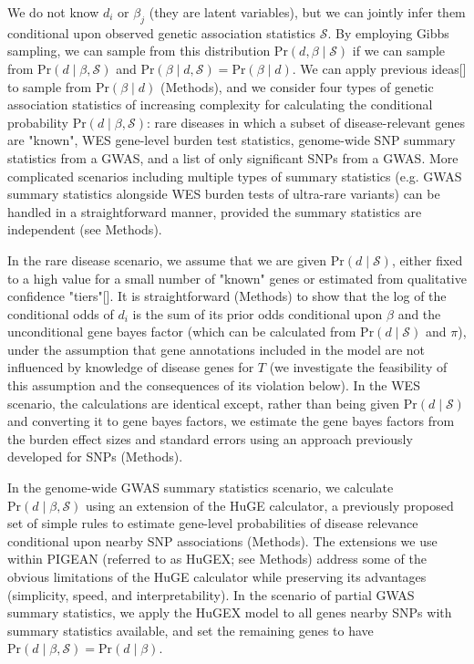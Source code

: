 \documentclass[sn-nature,lineno]{sn-jnl}%
\theoremstyle{thmstyleone}%
\theoremstyle{thmstyletwo}%
\theoremstyle{thmstylethree}%
\newcommand{\prob}{\text{Pr}}
\begin{document}
We do not know $d_i$ or $\beta_j$ (they are latent variables), but we can jointly infer them conditional upon observed genetic association statistics $\mathcal{S}$. By employing Gibbs sampling, we can sample from this distribution $\prob(d, \beta \mid \mathcal{S})$ if we can sample from $\prob(d \mid \beta, \mathcal{S})$ and $\prob(\beta \mid d, \mathcal{S})=\prob(\beta \mid d)$. We can apply previous ideas[] to sample from $\prob(\beta \mid d)$ (Methods), and we consider four types of genetic association statistics of increasing complexity for calculating the conditional probability $\prob(d \mid \beta, \mathcal{S})$: rare diseases in which a subset of disease-relevant genes are "known", WES gene-level burden test statistics, genome-wide SNP summary statistics from a GWAS, and a list of only significant SNPs from a GWAS. More complicated scenarios including multiple types of summary statistics (e.g. GWAS summary statistics alongside WES burden tests of ultra-rare variants) can be handled in a straightforward manner, provided the summary statistics are independent (see Methods).

In the rare disease scenario, we assume that we are given $\prob(d \mid \mathcal{S})$, either fixed to a high value for a small number of "known" genes or estimated from qualitative confidence "tiers"[].  It is straightforward (Methods) to show that the log of the conditional odds of $d_i$ is the sum of its prior odds conditional upon $\beta$ and the unconditional gene bayes factor (which can be calculated from $\prob(d \mid \mathcal{S})$ and $\pi$), under the assumption that gene annotations included in the model are not influenced by knowledge of disease genes for $T$ (we investigate the feasibility of this assumption and the consequences of its violation below). In the WES scenario, the calculations are identical except, rather than being given $\prob(d \mid \mathcal{S})$ and converting it to gene bayes factors, we estimate the gene bayes factors from the burden effect sizes and standard errors using an approach previously developed for SNPs (Methods).

In the genome-wide GWAS summary statistics scenario, we calculate $\prob(d \mid \beta, \mathcal{S})$ using an extension of the HuGE calculator, a previously proposed set of simple rules to estimate gene-level probabilities of disease relevance conditional upon nearby SNP associations (Methods). The extensions we use within PIGEAN (referred to as HuGEX; see Methods) address some of the obvious limitations of the HuGE calculator while preserving its advantages (simplicity, speed, and interpretability). In the  scenario of partial GWAS summary statistics, we apply the HuGEX model to all genes nearby SNPs with summary statistics available, and set the remaining genes to have $\prob(d \mid \beta, \mathcal{S})=\prob(d \mid \beta)$. 
\end{document}
